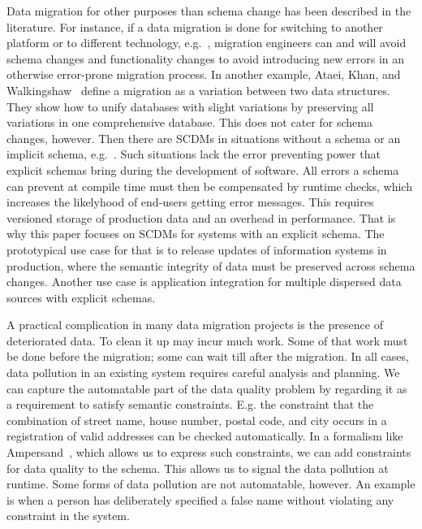 \documentclass[runningheads]{llncs}
\begin{document}
   Data migration for other purposes than schema change has been described in the literature.
   For instance, if a data migration is done for switching to another platform or to different technology,
   e.g.~\cite{Gholami2016,Bisbal1999},
   migration engineers can and will avoid schema changes and functionality changes
   to avoid introducing new errors in an otherwise error-prone migration process.
   In another example, Ataei, Khan, and Walkingshaw~\cite{Ataei2021,Walkingshaw2014} define a migration as a variation between two data structures.
   They show how to unify databases with slight variations by preserving all variations in one comprehensive database.
   This does not cater for schema changes, however.
   Then there are SCDMs in situations without a schema or an implicit schema, e.g.~\cite{Hillenbrand2022}.
   Such situations lack the error preventing power that explicit schemas bring during the development of software.
   All errors a schema can prevent at compile time must then be compensated by runtime checks,
   which increases the likelyhood of end-users getting error messages.
   This requires versioned storage of production data and an overhead in performance.
   That is why this paper focuses on SCDMs for systems with an explicit schema.
   The prototypical use case for that is to release updates of information systems in production,
   where the semantic integrity of data must be preserved across schema changes.
   Another use case is application integration for multiple dispersed data sources with explicit schemas.

   A practical complication in many data migration projects is the presence of deteriorated data.
   To clean it up may incur much work.
   Some of that work must be done before the migration; some can wait till after the migration.
   In all cases, data pollution in an existing system requires careful analysis and planning.
   We can capture the automatable part of the data quality problem by regarding it as a requirement to satisfy semantic constraints.
   E.g. the constraint that the combination of street name, house number, postal code, and city occurs in
   a registration of valid addresses can be checked automatically.
   In a formalism like Ampersand~\cite{JoostenRAMiCS2017,Joosten-JLAMP2018}, which allows us to express such constraints, we can add constraints for data quality to the schema.
   This allows us to signal the data pollution at runtime.
   Some forms of data pollution are not automatable, however.
   An example is when a person has deliberately specified a false name without violating any constraint in the system.
\end{document}
